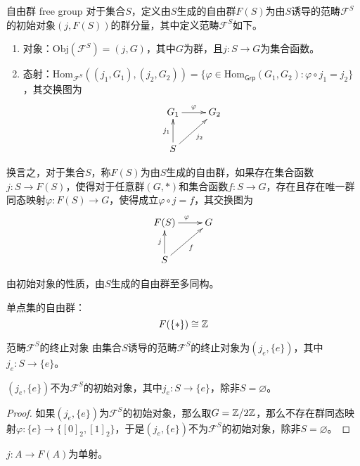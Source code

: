 \begin{definition}{自由群 free group}
	对于集合$S$，定义由$S$生成的自由群$F(S)$为由$S$诱导的范畴$\mathscr{F}^S$的初始对象$(j,F(S))$的群分量，其中定义范畴$\mathscr{F}^S$如下。
	\begin{enumerate}
		\item 对象：$\mathrm{Obj}(\mathscr{F}^S)=(j,G)$，其中$G$为群，且$j:S\to G$为集合函数。
		\item 态射：$\mathrm{Hom}_{\mathscr{F}^S}((j_1,G_1),(j_2,G_2))=\{ \varphi\in\mathrm{Hom}_{\mathsf{Grp}}(G_1,G_2): \varphi\circ j_1=j_2 \}$，其交换图为
		$$
		\xymatrix{
			G_1 \ar[r]^{\varphi} & G_2\\
			S \ar[u]^{j_1} \ar[ur]_{j_2}
		}
		$$
	\end{enumerate}
	换言之，对于集合$S$，称$F(S)$为由$S$生成的自由群，如果存在集合函数$j:S\to F(S)$，使得对于任意群$(G,*)$和集合函数$f:S\to G$，存在且存在唯一群同态映射$\varphi:F(S)\to G$，使得成立$\varphi\circ j=f$，其交换图为
	$$
	\xymatrix{
		F(S) \ar[r]^{\varphi} & G\\
		S \ar[u]^{j} \ar[ur]_{f}
	}
	$$
\end{definition}

\begin{note}
	由初始对象的性质，由$S$生成的自由群至多同构。
\end{note}

\begin{example}
	单点集的自由群：
	$$
	F(\{*\})\cong \mathbb{Z}
	$$
\end{example}

\begin{proposition}{范畴$\mathscr{F}^S$的终止对象}
	由集合$S$诱导的范畴$\mathscr{F}^S$的终止对象为$(j_e,\{e\})$，其中$j_e:S\to\{e\}$。
\end{proposition}

\begin{proposition}
	$(j_e,\{e\})$不为$\mathscr{F}^S$的初始对象，其中$j_e:S\to\{e\}$，除非$S=\varnothing$。
\end{proposition}

\begin{proof}
	如果$(j_e,\{e\})$为$\mathscr{F}^S$的初始对象，那么取$G=\mathbb{Z}/2\mathbb{Z}$，那么不存在群同态映射$\varphi:\{e\}\to \{[0]_2,[1]_2\}$，于是$(j_e,\{e\})$不为$\mathscr{F}^S$的初始对象，除非$S=\varnothing$。
\end{proof}

\begin{proposition}
	$j:A \to F(A)$为单射。
\end{proposition}

